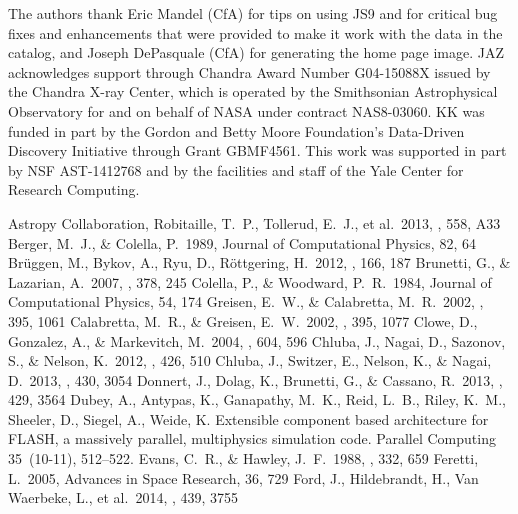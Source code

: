 \documentclass{emulateapj}
\begin{document}
\acknowledgements
The authors thank Eric Mandel (CfA) for tips on using JS9 and for critical bug fixes and enhancements that were provided to make it work with the data in the catalog, and Joseph DePasquale (CfA) for generating the home page image. JAZ acknowledges support through Chandra Award Number G04-15088X issued by the Chandra X-ray Center, which is operated by the Smithsonian Astrophysical Observatory for and on behalf of NASA under contract NAS8-03060. KK was funded in part by the Gordon and Betty Moore Foundation's Data-Driven Discovery Initiative through Grant GBMF4561. This work was supported in part by NSF AST-1412768 and by the facilities and staff of the Yale Center for Research Computing.

\begin{thebibliography}{}
 Astropy Collaboration, Robitaille, T.~P., Tollerud, E.~J., et al.\ 2013, \aap, 558, A33
 Berger, M.~J., \& Colella, P.\ 1989, Journal of Computational Physics, 82, 64
 Br{\"u}ggen, M., Bykov, A., Ryu, D., R{\"o}ttgering, H.\ 2012, \ssr, 166, 187
 Brunetti, G., \& Lazarian, A.\ 2007, \mnras, 378, 245
 Colella, P., \& Woodward, P.~R.\ 1984, Journal of Computational Physics, 54, 174
 Greisen, E.~W., \& Calabretta, M.~R.\ 2002, \aap, 395, 1061
 Calabretta, M.~R., \& Greisen, E.~W.\ 2002, \aap, 395, 1077
 Clowe, D., Gonzalez, A., \& Markevitch, M.\ 2004, \apj, 604, 596
 Chluba, J., Nagai, D., Sazonov, S., \& Nelson, K.\ 2012, \mnras, 426, 510
 Chluba, J., Switzer, E., Nelson, K., \& Nagai, D.\ 2013, \mnras, 430, 3054
 Donnert, J., Dolag, K., Brunetti, G., \& Cassano, R.\ 2013, \mnras, 429, 3564
 {Dubey}, A., {Antypas}, K.,
  {Ganapathy}, M.~K., {Reid}, L.~B., {Riley}, K.~M., {Sheeler}, D.,
  {Siegel}, A., {Weide}, K. Extensible component based architecture
  for FLASH, a massively parallel, multiphysics simulation
  code. Parallel Computing 35~(10-11), 512--522.
 Evans, C.~R., \& Hawley, J.~F.\ 1988, \apj, 332, 659
 Feretti, L.\ 2005, Advances in Space Research, 36, 729
 Ford, J., Hildebrandt, H., Van Waerbeke, L., et al.\ 2014, \mnras, 439, 3755

\end{thebibliography}
\end{document}
